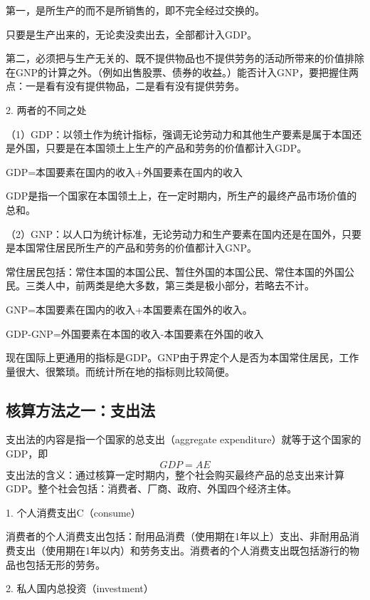 \documentclass{article}
\begin{document}
第一，是所生产的而不是所销售的，即不完全经过交换的。

只要是生产出来的，无论卖没卖出去，全部都计入GDP。

第二，必须把与生产无关的、既不提供物品也不提供劳务的活动所带来的价值排除在GNP的计算之外。（例如出售股票、债券的收益。）能否计入GNP，要把握住两点：一是看有没有提供物品，二是看有没有提供劳务。

\hspace*{\fill}

2. 两者的不同之处

（1）GDP：以领土作为统计指标，强调无论劳动力和其他生产要素是属于本国还是外国，只要是在本国领土上生产的产品和劳务的价值都计入GDP。

GDP=本国要素在国内的收入+外国要素在国内的收入

GDP是指一个国家在本国领土上，在一定时期内，所生产的最终产品市场价值的总和。

（2）GNP：以人口为统计标准，无论劳动力和生产要素在国内还是在国外，只要是本国常住居民所生产的产品和劳务的价值都计入GNP。

常住居民包括：常住本国的本国公民、暂住外国的本国公民、常住本国的外国公民。三类人中，前两类是绝大多数，第三类是极小部分，若略去不计。

GNP=本国要素在国内的收入+本国要素在国外的收入。

\hspace*{\fill}

GDP-GNP=外国要素在本国的收入-本国要素在外国的收入

现在国际上更通用的指标是GDP。GNP由于界定个人是否为本国常住居民，工作量很大、很繁琐。而统计所在地的指标则比较简便。

\subsection{核算方法之一：支出法}
支出法的内容是指一个国家的总支出（aggregate expenditure）就等于这个国家的GDP，即
\[
GDP=AE
\]
支出法的含义：通过核算一定时期内，整个社会购买最终产品的总支出来计算GDP。整个社会包括：消费者、厂商、政府、外国四个经济主体。

1. 个人消费支出C（consume）

消费者的个人消费支出包括：耐用品消费（使用期在1年以上）支出、非耐用品消费支出（使用期在1年以内）和劳务支出。消费者的个人消费支出既包括游行的物品也包括无形的劳务。

\hspace*{\fill}

2. 私人国内总投资（investment）
\end{document}
